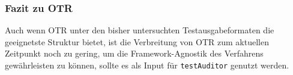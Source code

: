 \subsubsection{Fazit zu OTR}
Auch wenn OTR unter den bisher untersuchten Testausgabeformaten die geeignetste Struktur bietet, ist die Verbreitung von OTR zum aktuellen Zeitpunkt noch zu gering, um die Framework-Agnostik des Verfahrens gewährleisten zu können, sollte es als Input für \texttt{testAuditor} genutzt werden.





